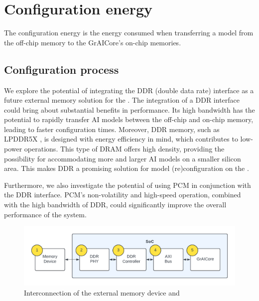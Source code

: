 \section{Configuration energy}
\label{section:configuration_energy}
The configuration energy is the energy consumed when transferring a model from the off-chip memory to the GrAICore's on-chip memories.

\subsection{Configuration process}
We explore the potential of integrating the DDR (double data rate) interface as a future external memory solution for the \graicore{}.
The integration of a DDR interface could bring about substantial benefits in performance.
Its high bandwidth has the potential to rapidly transfer AI models between the off-chip and on-chip memory, leading to faster configuration times.
Moreover, DDR memory, such as LPDDR5X \cite{JEDEC_JESD209-5C}, is designed with energy efficiency in mind, which contributes to low-power operations.
This type of DRAM offers high density, providing the possibility for accommodating more and larger AI models on a smaller silicon area.
This makes DDR a promising solution for model (re)configuration on the \graicore{}.

Furthermore, we also investigate the potential of using PCM in conjunction with the DDR interface.
PCM's non-volatility and high-speed operation, combined with the high bandwidth of DDR, could significantly improve the overall performance of the system.

\begin{figure}[hbtp]
    \centering
    \includegraphics[width=\linewidth]{assets/ddr_graicore_block_diagram.pdf}
    \caption{
        Interconnection of the external memory device and \graicore{}
    }
    \label{fig:ddr_graicore_block_diagram}
\end{figure}

